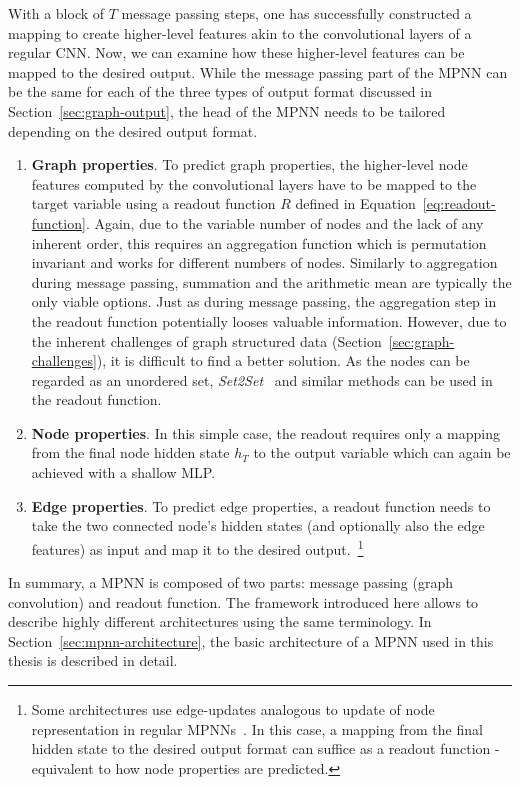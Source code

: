 With a block of $T$ message passing steps, one has successfully constructed a mapping to create higher-level features akin to the convolutional layers of a regular CNN. Now, we can examine how these higher-level features can be mapped to the desired output. While the message passing part of the MPNN can be the same for each of the three types of output format discussed in Section~\ref{sec:graph-output}, the head of the MPNN needs to be tailored depending on the desired output format.

\begin{enumerate}
	\item \textbf{Graph properties}. To predict graph properties, the higher-level node features computed by the convolutional layers have to be mapped to the target variable using a readout function $R$ defined in Equation~\ref{eq:readout-function}. Again, due to the variable number of nodes and the lack of any inherent order, this requires an aggregation function which is permutation invariant and works for different numbers of nodes. Similarly to aggregation during message passing, summation and the arithmetic mean are typically the only viable options.
	Just as during message passing, the aggregation step in the readout function potentially looses valuable information. However, due to the inherent challenges of graph structured data (Section~\ref{sec:graph-challenges}), it is difficult to find a better solution. As the nodes can be regarded as an unordered set, \textit{Set2Set}~\cite{Vinyals2015} and similar methods can be used in the readout function.
	\item \textbf{Node properties}. In this simple case, the readout requires only a mapping from the final node hidden state $h_T$ to the output variable which can again be achieved with a shallow MLP.
	\item \textbf{Edge properties}. To predict edge properties, a readout function needs to take the two connected node's hidden states (and optionally also the edge features) as input and map it to the desired output.~\footnote{Some architectures use edge-updates analogous to update of node representation in regular MPNNs~\cite{Jørgensen2018}. In this case, a mapping from the final hidden state to the desired output format can suffice as a readout function - equivalent to how node properties are predicted.}
\end{enumerate}


In summary, a MPNN is composed of two parts: message passing (graph convolution) and readout function. The framework introduced here allows to describe highly different architectures using the same terminology. In Section~\ref{sec:mpnn-architecture}, the basic architecture of a MPNN used in this thesis is described in detail.

